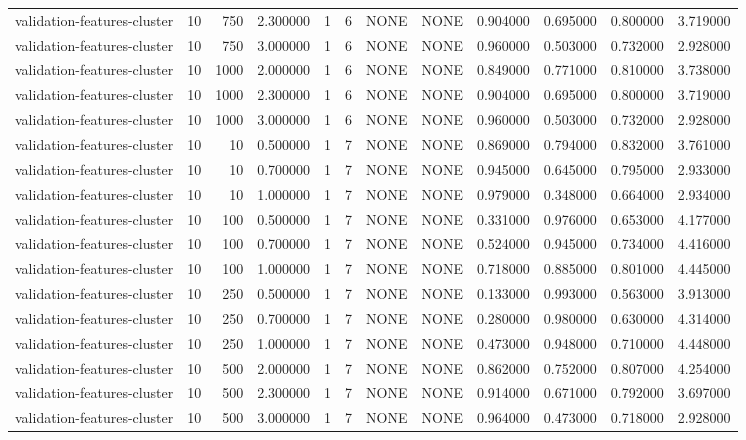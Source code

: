 \begin{tabular}{lrrrllllrrrr}
validation-features-cluster & 10 & 750 & 2.300000 & 1 & 6 & NONE & NONE & 0.904000 & 0.695000 & 0.800000 & 3.719000 \\
validation-features-cluster & 10 & 750 & 3.000000 & 1 & 6 & NONE & NONE & 0.960000 & 0.503000 & 0.732000 & 2.928000 \\
validation-features-cluster & 10 & 1000 & 2.000000 & 1 & 6 & NONE & NONE & 0.849000 & 0.771000 & 0.810000 & 3.738000 \\
validation-features-cluster & 10 & 1000 & 2.300000 & 1 & 6 & NONE & NONE & 0.904000 & 0.695000 & 0.800000 & 3.719000 \\
validation-features-cluster & 10 & 1000 & 3.000000 & 1 & 6 & NONE & NONE & 0.960000 & 0.503000 & 0.732000 & 2.928000 \\
validation-features-cluster & 10 & 10 & 0.500000 & 1 & 7 & NONE & NONE & 0.869000 & 0.794000 & 0.832000 & 3.761000 \\
validation-features-cluster & 10 & 10 & 0.700000 & 1 & 7 & NONE & NONE & 0.945000 & 0.645000 & 0.795000 & 2.933000 \\
validation-features-cluster & 10 & 10 & 1.000000 & 1 & 7 & NONE & NONE & 0.979000 & 0.348000 & 0.664000 & 2.934000 \\
validation-features-cluster & 10 & 100 & 0.500000 & 1 & 7 & NONE & NONE & 0.331000 & 0.976000 & 0.653000 & 4.177000 \\
validation-features-cluster & 10 & 100 & 0.700000 & 1 & 7 & NONE & NONE & 0.524000 & 0.945000 & 0.734000 & 4.416000 \\
validation-features-cluster & 10 & 100 & 1.000000 & 1 & 7 & NONE & NONE & 0.718000 & 0.885000 & 0.801000 & 4.445000 \\
validation-features-cluster & 10 & 250 & 0.500000 & 1 & 7 & NONE & NONE & 0.133000 & 0.993000 & 0.563000 & 3.913000 \\
validation-features-cluster & 10 & 250 & 0.700000 & 1 & 7 & NONE & NONE & 0.280000 & 0.980000 & 0.630000 & 4.314000 \\
validation-features-cluster & 10 & 250 & 1.000000 & 1 & 7 & NONE & NONE & 0.473000 & 0.948000 & 0.710000 & 4.448000 \\
validation-features-cluster & 10 & 500 & 2.000000 & 1 & 7 & NONE & NONE & 0.862000 & 0.752000 & 0.807000 & 4.254000 \\
validation-features-cluster & 10 & 500 & 2.300000 & 1 & 7 & NONE & NONE & 0.914000 & 0.671000 & 0.792000 & 3.697000 \\
validation-features-cluster & 10 & 500 & 3.000000 & 1 & 7 & NONE & NONE & 0.964000 & 0.473000 & 0.718000 & 2.928000 \\

\end{tabular}
